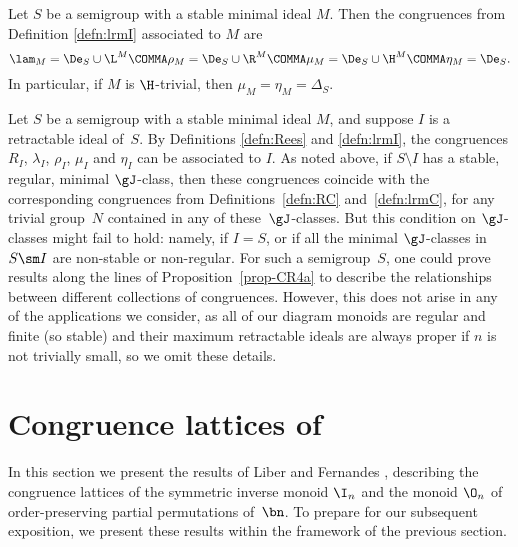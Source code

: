 \begin{prop}
\label{prop-CR5}
Let $S$ be a semigroup with a stable minimal ideal $M$.  Then the congruences from Definition \ref{defn:lrmI} associated to $M$ are
\[
\lam_M = \De_S\cup {\L^M} \COMMA
\rho_M = \De_S\cup {\R^M} \COMMA
\mu_M = \De_S\cup {\H^M} \COMMA
\eta_M = \De_S.
\]
  In particular, if $M$ is $\H$-trivial, then $\mu_M=\eta_M=\Delta_S$. 
  \epfres
\end{prop}

\begin{rem}
Let $S$ be a semigroup with a stable minimal ideal $M$, and suppose $I$ is a retractable ideal of~$S$.  By Definitions \ref{defn:Rees} and \ref{defn:lrmI}, the congruences $R_I$, $\lambda_I$, $\rho_I$, $\mu_I$ and $\eta_I$ can be associated to $I$.  As noted above, if $S\setminus I$ has a stable, regular, minimal $\gJ$-class, then these congruences coincide with the corresponding congruences from Definitions~\ref{defn:RC} and~\ref{defn:lrmC}, for any trivial group~$N$ contained in any of these~$\gJ$-classes.  But this condition on $\gJ$-classes might fail to hold: namely, if $I=S$, or if all the minimal $\gJ$-classes in~$S\sm I$ are non-stable or non-regular.  For such a semigroup~$S$, one could prove results along the lines of Proposition~\ref{prop-CR4a} to describe the relationships between different collections of congruences.  However, this does not arise in any of the applications we consider, as all of our diagram monoids are regular and finite (so stable) and their maximum retractable ideals are always proper if $n$ is not trivially small, so we omit these details. 
\end{rem}

\section{Congruence lattices of }
\label{sec:SnInOn}

In this section we present the results of Liber \cite{Liber1953} and Fernandes
\cite{Fernandes2001}, describing the congruence lattices of the symmetric
inverse monoid $\I_n$ and the monoid $\O_n$ of order-preserving
partial permutations of~$\bn$.  To prepare for our subsequent exposition, we
present these results within the framework of the previous section.

